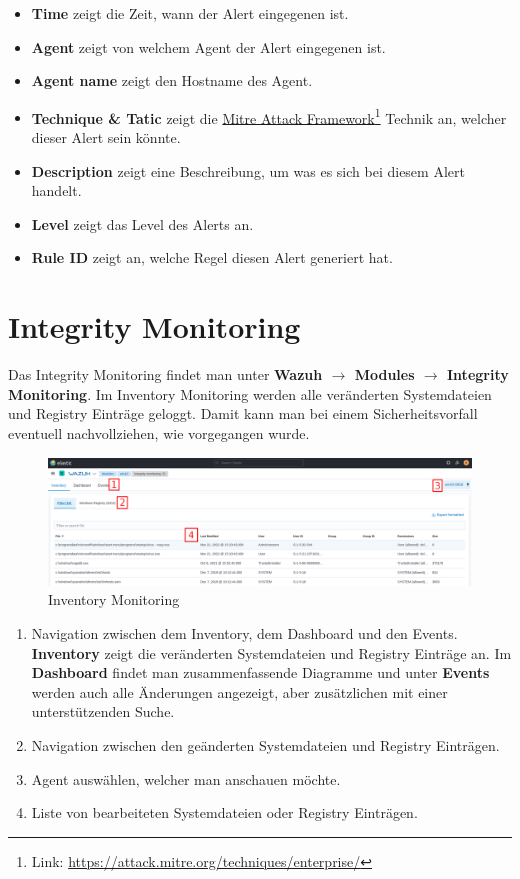 \begin{itemize}
    \item \textbf{Time} zeigt die Zeit, wann der Alert eingegenen ist.
    \item \textbf{Agent} zeigt von welchem Agent der Alert eingegenen ist.
    \item \textbf{Agent name} zeigt den Hostname des Agent.
    \item \textbf{Technique \& Tatic} zeigt die \href{https://attack.mitre.org/techniques/enterprise/}{Mitre Attack Framework}\footnote{Link: \href{https://attack.mitre.org/techniques/enterprise/}{https://attack.mitre.org/techniques/enterprise/}} Technik an, welcher dieser Alert sein könnte.
    \item \textbf{Description} zeigt eine Beschreibung, um was es sich bei diesem Alert handelt.
    \item \textbf{Level} zeigt das Level des Alerts an. 
    \item \textbf{Rule ID} zeigt an, welche Regel diesen Alert generiert hat.
\end{itemize}

\section{Integrity Monitoring}
Das Integrity Monitoring findet man unter \textbf{Wazuh $\rightarrow$ Modules $\rightarrow$ Integrity Monitoring}.
Im Inventory Monitoring werden alle veränderten Systemdateien und Registry Einträge geloggt. 
Damit kann man bei einem Sicherheitsvorfall eventuell nachvollziehen, wie vorgegangen wurde.

\begin{figure}[H]
    \centering
    \includegraphics[width=\linewidth]{../img/wazuh-im-inventory.png}
    \caption{Inventory Monitoring}
\end{figure}

\begin{enumerate}
    \item Navigation zwischen dem Inventory, dem Dashboard und den Events.
    \textbf{Inventory} zeigt die veränderten Systemdateien und Registry Einträge an. Im \textbf{Dashboard} findet man zusammenfassende Diagramme und unter \textbf{Events} werden auch alle Änderungen angezeigt, aber zusätzlichen mit einer unterstützenden Suche. 
    \item Navigation zwischen den geänderten Systemdateien und Registry Einträgen.
    \item Agent auswählen, welcher man anschauen möchte.
    \item Liste von bearbeiteten Systemdateien oder Registry Einträgen.
\end{enumerate}

